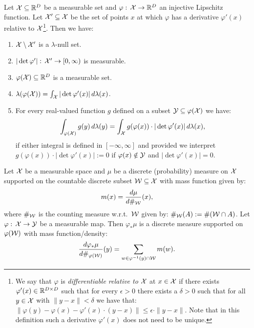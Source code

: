 \begin{Thm}
    Let $\mathcal{X} \subseteq \mathbb{R}^D$ be a measurable set 
    and $\varphi:\, \mathcal{X} \to \mathbb{R}^D$ an injective Lipschitz function.
Let $\mathcal{X}' \subseteq \mathcal{X}$ be the set of points $x$ at which $\varphi$ has a derivative $\varphi'(x)$ relative to $\mathcal{X}$\footnote{We say that $\varphi$ is \emph{differentiable relative to $\mathcal{X}$} at $x \in \mathcal{X}$  if there exists  $\varphi'(x) \in \mathbb{R}^{D \times D}$ such that for every $\epsilon >0$ there exists a $\delta >0$ such that for all
    $y \in \mathcal{X}$ with $\|y-x\| < \delta$  we have that: 
$\|\varphi(y)-\varphi(x) - \varphi'(x) \cdot (y-x) \| \le \epsilon \cdot \|y-x\| $. Note that in this definition such a derivative $\varphi'(x)$ does not need to be unique.}.
Then we have:
    \begin{enumerate}
        \item $\mathcal{X} \setminus \mathcal{X}'$ is a $\lambda$-null set.
        \item $|\det \varphi'|:\, \mathcal{X}' \to [0,\infty)$ is measurable.
        \item $\varphi(\mathcal{X}) \subseteq \mathbb{R}^D$ is a measurable set.
        \item $\lambda(\varphi(\mathcal{X})) = \int_{\mathcal{X}} |\det \varphi'(x)| \,d\lambda(x)$.
        \item For every real-valued function $g$ defined on a subset $\mathcal{Y} \subseteq \varphi(\mathcal{X})$
            we have:
            \[ \int_{\varphi(\mathcal{X})} g(y)\,d\lambda(y) = \int_{\mathcal{X}} g(\varphi(x)) \cdot |\det \varphi'(x)| \, d\lambda(x),  \]
            if either integral is defined in $[-\infty,\infty]$ and provided we interpret
            $g(\varphi(x)) \cdot |\det \varphi'(x)| := 0$ if $\varphi(x) \notin \mathcal{Y}$ and $|\det \varphi'(x)| =0$. 
    \end{enumerate}
\end{Thm}


\begin{Rem}
    Let $\mathcal{X}$ be a measurable space and $\mu$ be a discrete (probability) measure on $\mathcal{X}$ supported on the countable discrete subset $\mathcal{W} \subseteq \mathcal{X}$ with mass function given by:
    \[ m(x) = \frac{d\mu}{d\#_{\mathcal{W}}}(x),\]
    where $\#_{\mathcal{W}}$ is the counting measure w.r.t.\ $\mathcal{W}$ given by: $\#_{\mathcal{W}}(A) := \#(\mathcal{W} \cap A)$.
    Let $\varphi:\,\mathcal{X} \to \mathcal{Y}$ be a measurable map. Then $\varphi_*\mu$ is a discrete measure supported on $\varphi(\mathcal{W})$ 
    with mass function/density:
    \[ \frac{d\varphi_*\mu}{d\#_{\varphi(\mathcal{W})}}(y) = \sum_{ w \in \varphi^{-1}(y) \cap \mathcal{W} } m(w).
    \]
\end{Rem}

